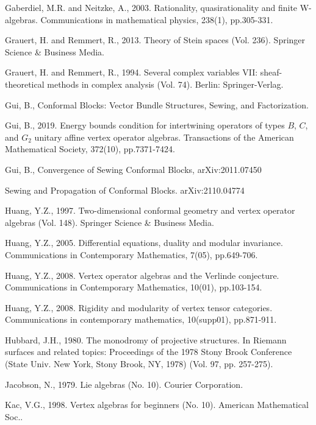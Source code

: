 \documentclass[11pt,b5paper,notitlepage]{article}
\theoremstyle{definition}
\theoremstyle{plain}
\numberwithin{equation}{section}
\begin{document}
\begin{thebibliography}{999999}
Gaberdiel, M.R. and Neitzke, A., 2003. Rationality, quasirationality and finite W-algebras. Communications in mathematical physics, 238(1), pp.305-331.



Grauert, H. and Remmert, R., 2013. Theory of Stein spaces (Vol. 236). Springer Science \& Business Media.

Grauert, H. and Remmert, R., 1994. Several complex variables VII: sheaf-theoretical methods in complex analysis (Vol. 74). Berlin: Springer-Verlag.

Gui, B., Conformal Blocks: Vector Bundle Structures, Sewing, and Factorization.

Gui, B., 2019. Energy bounds condition for intertwining operators of types $B$, $C$, and $G_2$ unitary affine vertex operator algebras. Transactions of the American Mathematical Society, 372(10), pp.7371-7424.

Gui, B., Convergence of Sewing Conformal Blocks,  arXiv:2011.07450

Sewing and Propagation of Conformal Blocks. arXiv:2110.04774

Huang, Y.Z., 1997. Two-dimensional conformal geometry and vertex operator algebras (Vol. 148). Springer Science \& Business Media.

Huang, Y.Z., 2005. Differential equations, duality and modular invariance. Communications in Contemporary Mathematics, 7(05), pp.649-706.
	
Huang, Y.Z., 2008. Vertex operator algebras and the Verlinde conjecture. Communications in Contemporary Mathematics, 10(01), pp.103-154.
	
	
Huang, Y.Z., 2008. Rigidity and modularity of vertex tensor categories. Communications in contemporary mathematics, 10(supp01), pp.871-911.

Hubbard, J.H., 1980. The monodromy of projective structures. In Riemann surfaces and related topics: Proceedings of the 1978 Stony Brook Conference (State Univ. New York, Stony Brook, NY, 1978) (Vol. 97, pp. 257-275).

Jacobson, N., 1979. Lie algebras (No. 10). Courier Corporation.

Kac, V.G., 1998. Vertex algebras for beginners (No. 10). American Mathematical Soc..



\end{thebibliography}
\end{document}
